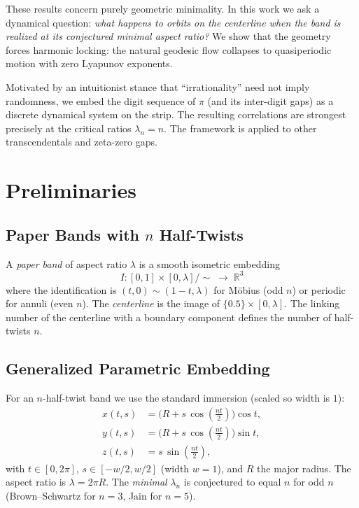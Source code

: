 \documentclass[11pt,a4paper]{article}
\begin{document}
These results concern purely geometric minimality. In this work we ask a dynamical question: \emph{what happens to orbits on the centerline when the band is realized at its conjectured minimal aspect ratio?} We show that the geometry forces harmonic locking: the natural geodesic flow collapses to quasiperiodic motion with zero Lyapunov exponents.  

Motivated by an intuitionist stance that ``irrationality'' need not imply randomness, we embed the digit sequence of $\pi$ (and its inter-digit gaps) as a discrete dynamical system on the strip. The resulting correlations are strongest precisely at the critical ratios $\lambda_n = n$. The framework is applied to other transcendentals and zeta-zero gaps.

\section{Preliminaries}

\subsection{Paper Bands with $n$ Half-Twists}
A \emph{paper band} of aspect ratio $\lambda$ is a smooth isometric embedding
\[
I: [0,1]\times[0,\lambda]/\sim \;\to\;\mathbb{R}^3
\]
where the identification is $(t,0)\sim(1-t,\lambda)$ for M\"obius (odd $n$) or periodic for annuli (even $n$). The \emph{centerline} is the image of $\{0.5\}\times[0,\lambda]$. The linking number of the centerline with a boundary component defines the number of half-twists $n$.

\subsection{Generalized Parametric Embedding}
For an $n$-half-twist band we use the standard immersion (scaled so width is $1$):
\[
\begin{aligned}
x(t,s) &= \bigl(R + s\,\cos(\tfrac{n t}{2})\bigr)\cos t, \\
y(t,s) &= \bigl(R + s\,\cos(\tfrac{n t}{2})\bigr)\sin t, \\
z(t,s) &= s\,\sin(\tfrac{n t}{2}),
\end{aligned}
\]
with $t\in[0,2\pi]$, $s\in[-w/2,w/2]$ (width $w=1$), and $R$ the major radius. The aspect ratio is $\lambda = 2\pi R$. The \emph{minimal} $\lambda_n$ is conjectured to equal $n$ for odd $n$ (Brown--Schwartz for $n=3$, Jain for $n=5$).
\end{document}
